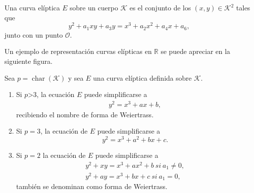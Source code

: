 Una curva elíptica $E$ sobre un cuerpo $\mathcal{K}$ es el conjunto de los $(x,y)\in \mathcal{K}^2$ tales que
$$
	y^2+a_1xy+a_3y = x^3+a_2x^2+a_4x+a_6,
$$
junto con un punto $\mathcal{O}$.

Un ejemplo de representación curvas elípticas en $\mathbb{R}$ se puede apreciar en la siguiente figura.
\begin{figure}[htb]
	\centering
	\qquad
\end{figure}

\begin{proposicion}
		Sea $p=\operatorname{char}(\mathcal{K})$ y sea $E$ una curva elíptica definida sobre $\mathcal{K}$.
		\begin{enumerate}
			\item Si $p$\textgreater$3$, la ecuación $E$ puede simplificarse a
		\begin{align}
			y^2=x^3+ax+b,\label{eq:tipo1}
		\end{align}
		recibiendo el nombre de forma de Weiertrass.
			\item Si $p=3$, la ecuación de $E$ puede simplificarse a 
		\begin{equation}
			y^2=x^3+a^2+bx+c.
		\end{equation}
			\item Si $p=2$ la ecuación de $E$ puede simplificarse a 
				\begin{align}
					y^2+xy=x^3+ax^2+b \: si\: a_1 \neq 0,\label{eq:uno}\\
					y^2+ay=x^3+bx+c \: si\: a_1=0,\label{eq:dos}
				\end{align}
		también se denominan como forma de Weiertrass.
		\end{enumerate}
\end{proposicion}

